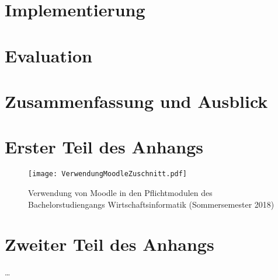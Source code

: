\documentclass[twoside,bibliography=totoc,openany]{fumi}
\begin{document}
\chapter{Implementierung}




\chapter{Evaluation}



\chapter{Zusammenfassung und Ausblick}



\appendix

\chapter{Erster Teil des Anhangs}
\begin{sidewaysfigure}
\texttt{[image: VerwendungMoodleZuschnitt.pdf]}
\caption{\label{fig:VerwendungMoodle} Verwendung von Moodle in den Pflichtmodulen des Bachelorstudiengangs Wirtschaftsinformatik (Sommersemester 2018)}
\end{sidewaysfigure}

\chapter{Zweiter Teil des Anhangs}
\dots




\backmatter
\pagestyle{fancyclear}



{\footnotesize\flushleft\setlength{\itemsep}{-3pt}%

}
\cleardoublepage


\listoffigures
\cleardoublepage


\listoftables
\cleardoublepage
\end{document}
